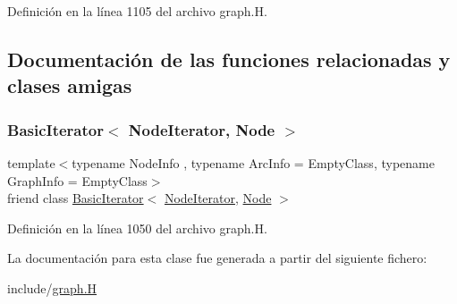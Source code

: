 Definición en la línea 1105 del archivo graph.\+H.



\subsection{Documentación de las funciones relacionadas y clases amigas}
\mbox{\label{class_designar_1_1_graph_1_1_node_iterator_a21dc6ae614d097ff896e9e8e422d8f3c}} 
\subsubsection{\texorpdfstring{Basic\+Iterator$<$ Node\+Iterator, Node $>$}{BasicIterator< NodeIterator, Node >}}
{\footnotesize\ttfamily template$<$typename Node\+Info , typename Arc\+Info  = Empty\+Class, typename Graph\+Info  = Empty\+Class$>$ \\
friend class \hyperlink{class_designar_1_1_basic_iterator}{Basic\+Iterator}$<$ \hyperlink{class_designar_1_1_graph_1_1_node_iterator}{Node\+Iterator}, \hyperlink{class_designar_1_1_graph_a5dfc7dba9d092ac489c72e40390c37d0}{Node} $>$\hspace{0.3cm}{\ttfamily [friend]}}



Definición en la línea 1050 del archivo graph.\+H.



La documentación para esta clase fue generada a partir del siguiente fichero\+:\begin{DoxyCompactItemize}
\item 
include/\hyperlink{graph_8_h}{graph.\+H}\end{DoxyCompactItemize}

